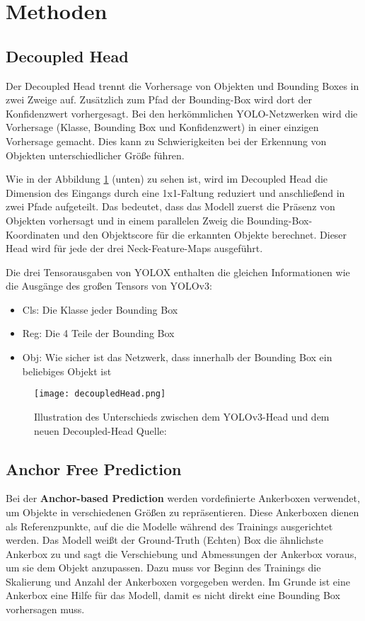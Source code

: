 \section{Methoden}
\subsection{Decoupled Head}\label{chap:decoupledHead}
Der Decoupled Head trennt die Vorhersage von Objekten und Bounding Boxes in zwei Zweige auf. Zusätzlich zum Pfad der Bounding-Box wird dort der Konfidenzwert vorhergesagt. Bei den herkömmlichen YOLO-Netzwerken wird die Vorhersage (Klasse, Bounding Box und Konfidenzwert) in einer einzigen Vorhersage gemacht. Dies kann zu Schwierigkeiten bei der Erkennung von Objekten unterschiedlicher Größe führen. 

Wie in der Abbildung \ref{fig:decoupledHead} (unten) zu sehen ist, wird im Decoupled Head die Dimension des Eingangs durch eine 1x1-Faltung reduziert und anschließend in zwei Pfade aufgeteilt. Das bedeutet, dass das Modell zuerst die Präsenz von Objekten vorhersagt und in einem parallelen Zweig die Bounding-Box-Koordinaten und den Objektscore für die erkannten Objekte berechnet. Dieser Head wird für jede der drei Neck-Feature-Maps ausgeführt. \cite{yoloxExplanationHowWorks}

Die drei Tensorausgaben von YOLOX enthalten die gleichen Informationen wie die Ausgänge des großen Tensors von YOLOv3:
\begin{itemize}
\item Cls: Die Klasse jeder Bounding Box
\item Reg: Die 4 Teile der Bounding Box
\item Obj: Wie sicher ist das Netzwerk, dass innerhalb der Bounding Box ein beliebiges Objekt ist
\end{itemize}


\begin{figure}[h]
	\centering
	\texttt{[image: decoupledHead.png]}
	\caption[Illustration des Unterschieds zwischen dem Yolov3-Head und dem neuen Decoupled-Head ]{Illustration des Unterschieds zwischen dem YOLOv3-Head und dem neuen Decoupled-Head Quelle: \cite{yoloxPaper}}
	\label{fig:decoupledHead}
\end{figure}




\subsection{Anchor Free Prediction}\label{chap:anchorFree}
Bei der \textbf{Anchor-based Prediction} werden vordefinierte Ankerboxen verwendet, um Objekte in verschiedenen Größen zu repräsentieren. Diese Ankerboxen dienen als Referenzpunkte, auf die die Modelle während des Trainings ausgerichtet werden. Das Modell weißt der Ground-Truth (Echten) Box die ähnlichste Ankerbox zu und sagt die Verschiebung und Abmessungen der Ankerbox voraus, um sie dem Objekt anzupassen. Dazu muss vor Beginn des Trainings die Skalierung und Anzahl der Ankerboxen vorgegeben werden. Im Grunde ist eine Ankerbox eine Hilfe für das Modell, damit es nicht direkt eine Bounding Box vorhersagen muss.


